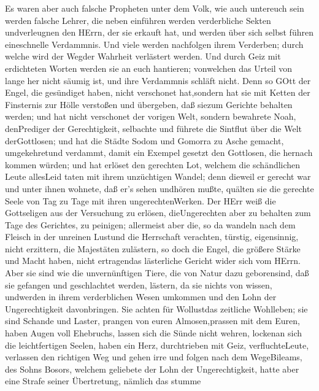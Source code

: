  Es waren aber auch falsche Propheten unter dem Volk, wie
auch untereuch sein werden falsche Lehrer, die neben einführen werden
verderbliche Sekten undverleugnen den HErrn, der sie erkauft hat, und
werden über sich selbst führen eineschnelle Verdammnis.  Und
viele werden nachfolgen ihrem Verderben; durch welche wird der Wegder
Wahrheit verlästert werden.  Und durch Geiz mit erdichteten
Worten werden sie an euch hantieren; vonwelchen das Urteil von lange her
nicht säumig ist, und ihre Verdammnis schläft nicht.  Denn
so GOtt der Engel, die gesündiget haben, nicht verschonet hat,sondern
hat sie mit Ketten der Finsternis zur Hölle verstoßen und übergeben, daß
siezum Gerichte behalten werden;  und hat nicht verschonet
der vorigen Welt, sondern bewahrete Noah, denPrediger der Gerechtigkeit,
selbachte und führete die Sintflut über die Welt derGottlosen;
 und hat die Städte Sodom und Gomorra zu Asche gemacht,
umgekehretund verdammt, damit ein Exempel gesetzt den Gottlosen, die
hernach kommen würden;  und hat erlöset den gerechten Lot,
welchem die schändlichen Leute allesLeid taten mit ihrem unzüchtigen
Wandel;  denn dieweil er gerecht war und unter ihnen
wohnete, daß er's sehen undhören mußte, quälten sie die gerechte Seele
von Tag zu Tage mit ihren ungerechtenWerken.  Der HErr weiß
die Gottseligen aus der Versuchung zu erlösen, dieUngerechten aber zu
behalten zum Tage des Gerichtes, zu peinigen;  allermeist
aber die, so da wandeln nach dem Fleisch in der unreinen Lustund die
Herrschaft verachten, türstig, eigensinnig, nicht erzittern, die
Majestäten zulästern,  so doch die Engel, die größere
Stärke und Macht haben, nicht ertragendas lästerliche Gericht wider sich
vom HErrn.  Aber sie sind wie die unvernünftigen Tiere, die
von Natur dazu geborensind, daß sie gefangen und geschlachtet werden,
lästern, da sie nichts von wissen, undwerden in ihrem verderblichen
Wesen umkommen  und den Lohn der Ungerechtigkeit
davonbringen. Sie achten für Wollustdas zeitliche Wohlleben; sie sind
Schande und Laster, prangen von euren Almosen,prassen mit dem Euren,
 haben Augen voll Ehebruchs, lassen sich die Sünde nicht
wehren, lockenan sich die leichtfertigen Seelen, haben ein Herz,
durchtrieben mit Geiz, verfluchteLeute,  verlassen den
richtigen Weg und gehen irre und folgen nach dem WegeBileams, des Sohns
Bosors, welchem geliebete der Lohn der Ungerechtigkeit, 
hatte aber eine Strafe seiner Übertretung, nämlich das stumme
